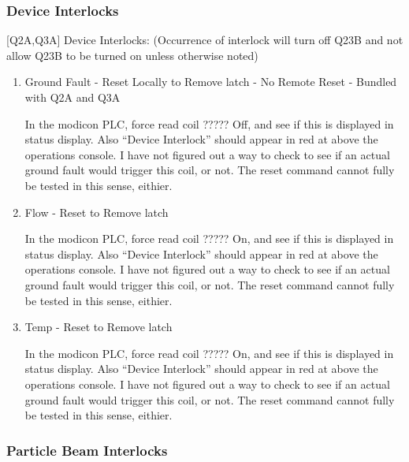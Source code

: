 \documentclass[11pt]{book}		%
\begin{document}
\subsubsection{Device Interlocks}\label{sect:cyc-equip-ctl-beamline-quad23b-state-monitors-device-interlocks}

[Q2A,Q3A] Device Interlocks:
(Occurrence of interlock will turn off Q23B and not allow Q23B to be turned on unless otherwise noted)

\begin{enumerate}
 \item [Q2A,Q3A] Ground Fault - Reset Locally to Remove latch - No Remote Reset - Bundled with Q2A and Q3A

\color{red}
In the modicon PLC, force read coil ????? Off, and see if this is displayed in status display. Also ``Device Interlock'' should appear in red at above the operations console. I have not figured out a way to check to see if an actual ground fault would trigger this coil, or not. The reset command cannot fully be tested in this sense, eithier.
\color{black}

 \item [Q2A,Q3A] Flow - Reset to Remove latch

\color{red}
In the modicon PLC, force read coil ????? On, and see if this is displayed in status display. Also ``Device Interlock'' should appear in red at above the operations console. I have not figured out a way to check to see if an actual ground fault would trigger this coil, or not. The reset command cannot fully be tested in this sense, eithier.
\color{black}

 \item [Q2A,Q3A] Temp - Reset to Remove latch

\color{red}
In the modicon PLC, force read coil ????? On, and see if this is displayed in status display. Also ``Device Interlock'' should appear in red at above the operations console. I have not figured out a way to check to see if an actual ground fault would trigger this coil, or not. The reset command cannot fully be tested in this sense, eithier.
\color{black}

\end{enumerate}

\subsubsection{Particle Beam Interlocks}\label{sect:cyc-equip-ctl-beamline-quad23b-state-monitors-beam-interlocks}
\end{document}
